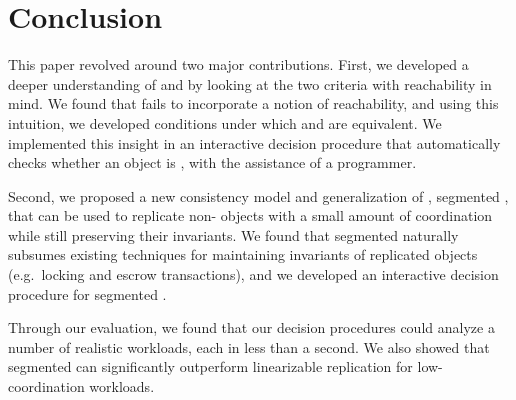 \section{Conclusion}
This paper revolved around two major contributions.
%
First, we developed a deeper understanding of \invariantclosure{} and
\invariantconfluence{} by looking at the two criteria with reachability in
mind. We found that \invariantclosure{} fails to incorporate a notion of
reachability, and using this intuition, we developed conditions under which
\invariantclosure{} and \invariantconfluence{} are equivalent. We implemented
this insight in an interactive \invariantconfluence{} decision procedure
that automatically checks whether an object is \invariantconfluent{}, with the
assistance of a programmer.

Second, we proposed a new consistency model and generalization of
\invariantconfluence{}, segmented \invariantconfluence{}, that can be used to
replicate non-\invariantconfluent{} objects with a small amount of coordination
while still preserving their invariants. We found that segmented
\invariantconfluence{} naturally subsumes existing techniques for maintaining
invariants of replicated objects (e.g.\ locking and escrow transactions), and
we developed an interactive decision procedure for segmented
\invariantconfluence{}.

Through our evaluation, we found that our decision procedures could analyze a
number of realistic workloads, each in less than a second. We also showed that
segmented \invariantconfluence{} can significantly outperform linearizable
replication for low-coordination workloads.
